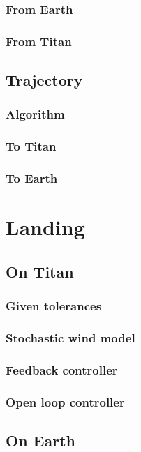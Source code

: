 \documentclass[10pt,a4paper]{article}
\begin{document}
	\subsubsection{From Earth}
	\subsubsection{From Titan}
	
	\subsection{Trajectory}
	\subsubsection{Algorithm}
	\subsubsection{To Titan}
	\subsubsection{To Earth}

	\section{Landing}
	\subsection{On Titan}
	\subsubsection{Given tolerances}
	\subsubsection{Stochastic wind model}
	\subsubsection{Feedback controller}
	\subsubsection{Open loop controller}
	
	\subsection{On Earth}
\end{document}
